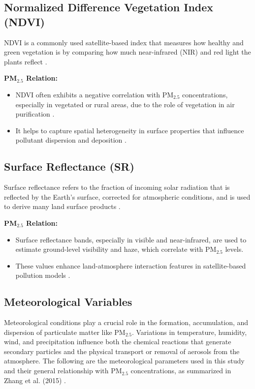 \documentclass[12pt]{report}
\begin{document}
\subsection*{Normalized Difference Vegetation Index (NDVI)}

NDVI is a commonly used satellite-based index that measures how healthy and green vegetation is by comparing how much near-infrared (NIR) and red light the plants reflect \cite{ndvi1}.

\noindent\textbf{PM$_{2.5}$ Relation:}
\begin{itemize}
    \item NDVI often exhibits a negative correlation with PM$_{2.5}$ concentrations, especially in vegetated or rural areas, due to the role of vegetation in air purification \cite{ozone1}.
    \item It helps to capture spatial heterogeneity in surface properties that influence pollutant dispersion and deposition \cite{ndvi2}.
\end{itemize}


\subsection*{Surface Reflectance (SR)}

Surface reflectance refers to the fraction of incoming solar radiation that is reflected by the Earth’s surface, corrected for atmospheric conditions, and is used to derive many land surface products \cite{surface1}.

\noindent\textbf{PM$_{2.5}$ Relation:}
\begin{itemize}
    \item Surface reflectance bands, especially in visible and near-infrared, are used to estimate ground-level visibility and haze, which correlate with PM$_{2.5}$ levels.
    \item These values enhance land-atmosphere interaction features in satellite-based pollution models \cite{surface2}.
\end{itemize}


\subsection*{Meteorological Variables}

Meteorological conditions play a crucial role in the formation, accumulation, and dispersion of particulate matter like PM$_{2.5}$. Variations in temperature, humidity, wind, and precipitation influence both the chemical reactions that generate secondary particles and the physical transport or removal of aerosols from the atmosphere. The following are the meteorological parameters used in this study and their general relationship with PM$_{2.5}$ concentrations, as summarized in Zhang et al. (2015) \cite{zhang2015effects}.
\end{document}

